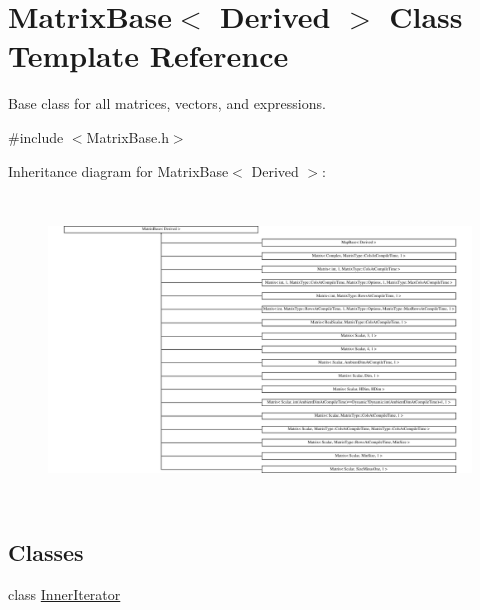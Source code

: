 \hypertarget{class_matrix_base}{\section{Matrix\-Base$<$ Derived $>$ Class Template Reference}
\label{class_matrix_base}
}


Base class for all matrices, vectors, and expressions.  




{\ttfamily \#include $<$Matrix\-Base.\-h$>$}

Inheritance diagram for Matrix\-Base$<$ Derived $>$\-:\begin{figure}[H]
\begin{center}
\leavevmode
\includegraphics[height=8.172043cm]{class_matrix_base}
\end{center}
\end{figure}
\subsection*{Classes}
\begin{DoxyCompactItemize}
\item 
class \hyperlink{class_matrix_base_1_1_inner_iterator}{Inner\-Iterator}
\end{DoxyCompactItemize}
